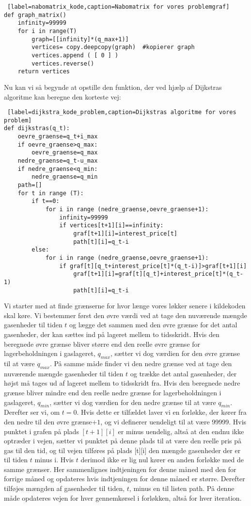 \begin{lstlisting} [label=nabomatrix_kode,caption=Nabomatrix for vores problemgraf]
def graph_matrix()	
	infinity=99999
	for i in range(T)
		graph=[[infinity]*(q_max+1)]
		vertices= copy.deepcopy(graph)  #kopierer graph
		vertices.append ( [ 0 ] )
		vertices.reverse()
	return vertices
\end{lstlisting}

Nu kan vi så begynde at opstille den funktion, der ved hjælp af Dijkstras algoritme kan beregne den korteste vej:

\begin{lstlisting} [label=dijkstra_kode_problem,caption=Dijkstras algoritme for vores problem]
def dijkstras(q_t):
	oevre_graense=q_t+i_max
	if oevre_graense>q_max:
		oevre_graense=q_max
	nedre_graense=q_t-u_max
	if nedre_graense<q_min:
		nedre_graense=q_min
	path=[]	
	for t in range (T):
		if t==0:
			for i in range (nedre_graense,oevre_graense+1):
				infinity=99999
				if vertices[t+1][i]==infinity:
					graf[t+1][i]=interest_price[t]
					path[t][i]=q_t-i
		else:
			for i in range (nedre_graense,oevre_graense+1):
				if graf[t][q_t+interest_price[t]*(q_t-i)]>graf[t+1][i]
					graf[t+1][i]=graf[t][q_t]+interest_price[t]*(q_t-1)
					path[t][i]=q_t-i
\end{lstlisting}

Vi starter med at finde grænserne for hvor længe vores løkker senere i kildekoden skal køre. Vi bestemmer først den øvre værdi ved at tage den nuværende mængde gasenheder til tiden $t$ og lægge det sammen med den øvre grænse for det antal gasenheder, der kan sættes ind på lageret mellem to tidsskridt. Hvis den beregnede øvre grænse bliver større end den reelle øvre grænse for lagerbeholdningen i gaslageret, $q_{max}$, sætter vi dog værdien for den øvre grænse til at være $q_{max}$. På samme måde finder vi den nedre grænse ved at tage den nuværende mængde gasenheder til tiden $t$ og trække det antal gasenheder, der højst må tages ud af lageret mellem to tidsskridt fra. Hvis den beregnede nedre grænse bliver mindre end den reelle nedre grænse for lagerbeholdningen i gaslageret, $q_{min}$, sætter vi dog værdien for den nedre grænse til at være $q_{min}$. Derefter ser vi, om $t=0$. Hvis dette er tilfældet laver vi en forløkke, der kører fra den nedre til den øvre grænse$+1$, og vi definerer uendeligt til at være 99999. Hvis punktet i grafen på plads $[t+1][i]$ er minus uendelig, altså at den endnu ikke optræder i vejen, sætter vi punktet på denne plads til at være den reelle pris på gas til den tid, og til vejen tilføres på plads [t][i] den mængde gasenheder der er til tiden $t$ minus i. Hvis $t$ derimod ikke er lig nul kører en anden forløkke med de samme grænser. Her sammenlignes indtjeningen for denne måned med den for forrige måned og opdateres hvis indtjeningen for denne måned er større. Derefter tilføjes mængden af gasenheder til tiden, $t$, minus en til listen path. På denne måde opdateres vejen for hver gennemkørsel i forløkken, altså for hver iteration.